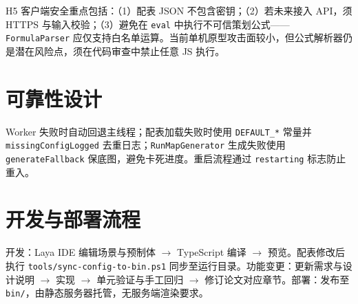 H5 客户端安全重点包括：（1）配表 JSON 不包含密钥；（2）若未来接入 API，须 HTTPS 与输入校验；（3）避免在 \texttt{eval} 中执行不可信策划公式——\texttt{FormulaParser} 应仅支持白名单运算\cite{gregory2018game}。当前单机原型攻击面较小，但公式解析器仍是潜在风险点，须在代码审查中禁止任意 JS 执行。

\section{可靠性设计}

Worker 失败时自动回退主线程；配表加载失败时使用 \texttt{DEFAULT\_*} 常量并 \texttt{missingConfigLogged} 去重日志；\texttt{RunMapGenerator} 生成失败使用 \texttt{generateFallback} 保底图，避免卡死进度。重启流程通过 \texttt{restarting} 标志防止重入。

\section{开发与部署流程}

开发：Laya IDE 编辑场景与预制体 $\rightarrow$ TypeScript 编译 $\rightarrow$ 预览。配表修改后执行 \texttt{tools/sync-config-to-bin.ps1} 同步至运行目录。功能变更：更新需求与设计说明 $\rightarrow$ 实现 $\rightarrow$ 单元验证与手工回归 $\rightarrow$ 修订论文对应章节。部署：发布至 \texttt{bin/}，由静态服务器托管，无服务端渲染要求\cite{munaiah2017github}。
